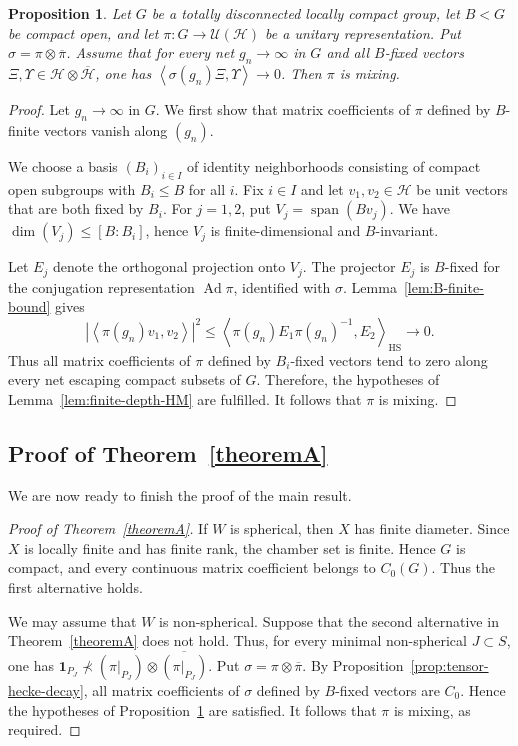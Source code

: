 \documentclass[12pt,a4paper]{amsproc}
\newtheorem{proposition}[theorem]{Proposition}
\theoremstyle{definition}
\DeclareMathOperator{\HS}{HS}
\DeclareMathOperator{\Ad}{Ad}
\newcommand{\cH}{\mathcal H}
\newcommand{\cU}{\mathcal U}
\newcommand{\one}{\mathbf 1}
\newcommand{\ol}[1]{\overline{#1}}
\newcommand{\abs}[1]{\left\lvert #1\right\rvert}
\newcommand{\ip}[2]{\left\langle #1,#2\right\rangle}
\newcommand{\weakcontain}{\prec}
\begin{document}
\begin{proposition}\label{prop:Bfixed-tensor-implies-C0}
Let $G$ be a totally disconnected locally compact group, let $B<G$ be compact open, and let $\pi \colon G\to\cU(\cH)$ be a   unitary representation. Put $\sigma=\pi\otimes\ol\pi$. Assume that for every net $g_n\to\infty$ in $G$ and all $B$-fixed vectors $\Xi,\Upsilon\in\cH\otimes\ol\cH$, one has $\ip{\sigma(g_n)\Xi}{\Upsilon}\to0$. Then $\pi$ is mixing.
\end{proposition}

\begin{proof}
Let $g_n\to\infty$ in $G$. We first show that matrix coefficients of $\pi$ defined by $B$-finite vectors vanish along $(g_n)$. 

We choose a basis  $(B_i)_{i \in I}$   of identity neighborhoods consisting of compact open subgroups with $B_i \leq B$ for all $i$. Fix $i \in I$ and let $v_1, v_2 \in \cH$ be unit vectors that are both fixed by $B_i$. For $j=1, 2$, put $V_j=\operatorname{span}(Bv_j)$. We have  $\dim(V_j) \leq [B:B_i]$, hence $V_j$ is finite-dimensional and $B$-invariant. 

Let $E_j$ denote the orthogonal projection onto $V_j$. The projector $E_j$ is $B$-fixed for the conjugation representation $\Ad\pi$, identified with $\sigma$. Lemma~\ref{lem:B-finite-bound} gives
\[
        \abs{\ip{\pi(g_n)v_1}{v_2}}^2
        \leq
        \ip{\pi(g_n)E_1\pi(g_n)^{-1}}{E_2}_{\HS}
        \longrightarrow0.
\]
Thus all matrix coefficients of $\pi$ defined by $B_i$-fixed vectors tend to zero along every net escaping compact subsets of $G$. Therefore, the hypotheses of Lemma~\ref{lem:finite-depth-HM} are fulfilled. It follows that $\pi$ is mixing.
\end{proof}

\subsection{Proof of Theorem~\ref{theoremA}}


We are now ready to finish the proof of  the main result.

\begin{proof}[Proof of Theorem~\ref{theoremA}]
If $W$ is spherical, then $X$ has finite diameter. Since $X$ is locally finite and has finite rank, the chamber set is finite. Hence $G$ is compact, and every continuous matrix coefficient belongs to $C_0(G)$. Thus the first alternative holds.

We may assume that $W$ is non-spherical. Suppose that the second alternative in Theorem~\ref{theoremA} does not hold. Thus, for every minimal non-spherical $J\subset S$, one has $\one_{P_J}\not\weakcontain (\pi|_{P_J})\otimes\ol{(\pi|_{P_J})}$. Put $\sigma=\pi\otimes\ol\pi$. By Proposition~\ref{prop:tensor-hecke-decay}, all   matrix coefficients of $\sigma$ defined by $B$-fixed vectors are $C_0$. Hence the hypotheses of Proposition~\ref{prop:Bfixed-tensor-implies-C0} are satisfied. It follows that  $\pi$ is mixing, as required. 
\end{proof}
\end{document}

